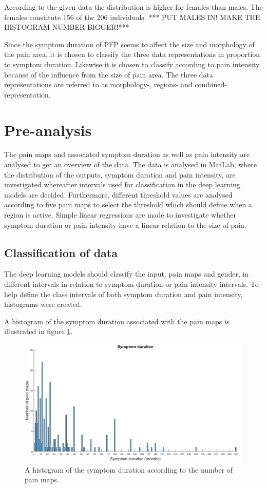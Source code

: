 \noindent
According to the given data the distribution is higher for females than males. The females constitute 156 of the 206 individuals. *** PUT MALES IN! MAKE THE HISTOGRAM NUMBER BIGGER!*** \newline


\noindent
Since the symptom duration of PFP seems to affect the size and morphology of the pain area, it is chosen to classify the three data representations in proportion to symptom duration. Likewise it is chosen to classify according to pain intensity because of the influence from the size of pain area. 
The three data representations are referred to as morphology-, regions- and combined-representation.
\newpage

\section{Pre-analysis}
The pain maps and associated symptom duration as well as pain intensity are analysed to get an overview of the data. The data is analysed in MatLab, where the distribution of the outputs, symptom duration and pain intensity, are investigated whereafter intervals used for classification in the deep learning models are decided. Furthermore, different threshold values are analysed according to five pain maps to select the threshold which should define when a region is active.
Simple linear regressions are made to investigate whether symptom duration or pain intensity have a linear relation to the size of pain.


\subsection{Classification of data}
The deep learning models should classify the input, pain maps and gender, in different intervals in relation to symptom duration or pain intensity intervals. To help define the class intervals of both symptom duration and pain intensity, histograms were created.

\noindent
A histogram of the symptom duration associated with the pain maps is illustrated in figure \ref{fig:histoduration}.

\begin{figure} [H]
\centering
\includegraphics[width=1\textwidth]{figures/histogramDuration}
\caption{A histogram of the symptom duration according to the number of pain maps.}
\label{fig:histoduration}
\end{figure}

